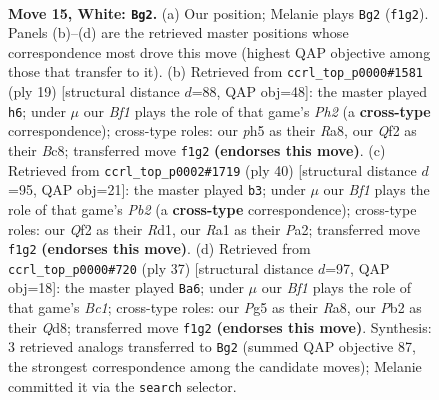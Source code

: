 \documentclass[11pt]{article}
\begin{document}
\clearpage

\begin{figure}[p]\centering
\begin{subfigure}{0.46\textwidth}\centering
\resizebox{\linewidth}{!}{%
\newchessgame
\chessboard[
  setfen={2r1kbnr/pb1p1pp1/4q3/2p1P1Pp/2p2P1P/2P4R/PP3Q2/RNB1KB2 w Qk h6 0 15},
  showmover=false,
  pgfstyle=straightmove, color=movearrow, markmove={f1-g2}
]}
\caption{}
\end{subfigure}\hfill
\begin{subfigure}{0.46\textwidth}\centering
\resizebox{\linewidth}{!}{%
\newchessgame
\chessboard[
  setfen={rnb1k2r/pp2nppp/4p3/3pP2P/q1pP4/P1P5/2PB1PP1/RQ2KBNR b KQkq - 0 10},
  showmover=false,
  pgfstyle=straightmove, color=movearrow, markmove={h7-h6}
]}
\caption{}
\end{subfigure}
\\[4pt]
\begin{subfigure}{0.46\textwidth}\centering
\resizebox{\linewidth}{!}{%
\newchessgame
\chessboard[
  setfen={2r2k1r/3bbp2/3p1p1p/p1q1pP2/1p2P3/4RBN1/PPPQ2PP/1K1R4 w - - 4 21},
  showmover=false,
  pgfstyle=straightmove, color=movearrow, markmove={b2-b3}
]}
\caption{}
\end{subfigure}\hfill
\begin{subfigure}{0.46\textwidth}\centering
\resizebox{\linewidth}{!}{%
\newchessgame
\chessboard[
  setfen={r1bqr1k1/3n1pp1/1p2p2p/pNbpP3/P4P2/6PP/1PQBP1BK/R2R4 b - - 1 19},
  showmover=false,
  pgfstyle=straightmove, color=movearrow, markmove={c8-a6}
]}
\caption{}
\end{subfigure}
\caption{\textbf{Move 15, White: \texttt{Bg2}.} (a) Our position; Melanie plays \texttt{Bg2} (\texttt{f1g2}). Panels (b)--(d) are the retrieved master positions whose correspondence most drove this move (highest QAP objective among those that transfer to it). (b) Retrieved from \texttt{ccrl\_top\_p0000\#1581} (ply 19) [structural distance $d$=88, QAP obj=48]: the master played \texttt{h6}; under $\mu$ our \emph{Bf1} plays the role of that game's \emph{Ph2} (a \textbf{cross-type} correspondence); cross-type roles: our \emph{p}h5 as their \emph{R}a8, our \emph{Q}f2 as their \emph{B}c8; transferred move \texttt{f1g2} \textbf{(endorses this move)}. (c) Retrieved from \texttt{ccrl\_top\_p0002\#1719} (ply 40) [structural distance $d$=95, QAP obj=21]: the master played \texttt{b3}; under $\mu$ our \emph{Bf1} plays the role of that game's \emph{Pb2} (a \textbf{cross-type} correspondence); cross-type roles: our \emph{Q}f2 as their \emph{R}d1, our \emph{R}a1 as their \emph{P}a2; transferred move \texttt{f1g2} \textbf{(endorses this move)}. (d) Retrieved from \texttt{ccrl\_top\_p0000\#720} (ply 37) [structural distance $d$=97, QAP obj=18]: the master played \texttt{Ba6}; under $\mu$ our \emph{Bf1} plays the role of that game's \emph{Bc1}; cross-type roles: our \emph{P}g5 as their \emph{R}a8, our \emph{P}b2 as their \emph{Q}d8; transferred move \texttt{f1g2} \textbf{(endorses this move)}. Synthesis: 3 retrieved analogs transferred to \texttt{Bg2} (summed QAP objective 87, the strongest correspondence among the candidate moves); Melanie committed it via the \texttt{search} selector.}
\label{fig:thought-m28}
\end{figure}
\end{document}
